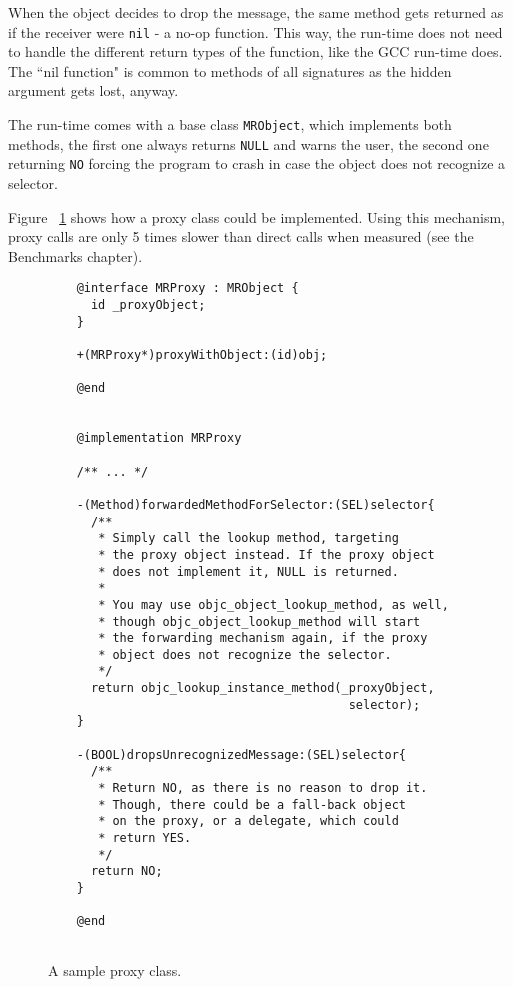 When the object decides to drop the message, the same method gets returned as if the receiver were \verb=nil= - a no-op function. This way, the run-time does not need to handle the different return types of the function, like the GCC run-time does. The ``nil function" is common to methods of all signatures as the hidden argument gets lost, anyway.

The run-time comes with a base class \verb=MRObject=, which implements both methods, the first one always returns \verb=NULL= and warns the user, the second one returning \verb=NO= forcing the program to crash in case the object does not recognize a selector.

Figure ~\ref{fig:forwarding_proxy_class} shows how a proxy class could be implemented. Using this mechanism, proxy calls are only 5 times slower than direct calls when measured (see the Benchmarks chapter).

\begin{figure}[H] 
  \begin{verbatim}
    @interface MRProxy : MRObject {
      id _proxyObject;
    }
    
    +(MRProxy*)proxyWithObject:(id)obj;
    
    @end
    
    
    @implementation MRProxy
    
    /** ... */
    
    -(Method)forwardedMethodForSelector:(SEL)selector{
      /** 
       * Simply call the lookup method, targeting
       * the proxy object instead. If the proxy object
       * does not implement it, NULL is returned.
       *
       * You may use objc_object_lookup_method, as well,
       * though objc_object_lookup_method will start
       * the forwarding mechanism again, if the proxy
       * object does not recognize the selector.
       */
      return objc_lookup_instance_method(_proxyObject, 
                                          selector);
    }
    
    -(BOOL)dropsUnrecognizedMessage:(SEL)selector{
      /** 
       * Return NO, as there is no reason to drop it.
       * Though, there could be a fall-back object 
       * on the proxy, or a delegate, which could 
       * return YES.
       */
      return NO;
    }
    
    @end
    
  \end{verbatim}
  \centering{}
  \caption{A sample proxy class.}
  \label{fig:forwarding_proxy_class}
\end{figure}

